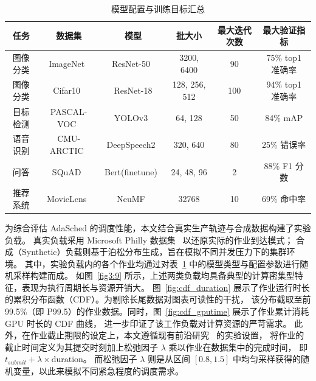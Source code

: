 \begin{table}[htbp]
  \centering
  \small %
  \setlength{\tabcolsep}{4pt} %
  \begin{threeparttable}
    \caption{模型配置与训练目标汇总}
    \label{tab:1}
    \begin{tabularx}{\textwidth}{c c c c c c}
      \toprule
      任务   & 数据集                                    & 模型                                   & 批大小           & 最大迭代次数 & 最大验证指标         \\
      \midrule
      图像分类 & ImageNet~\cite{deng2009imagenet}       & ResNet-50~\cite{he2016deep}          & 3200, 6400    & 90     & 75\% top1 准确率 \\
      图像分类 & Cifar10~\cite{krizhevsky2009learning}  & ResNet-18                            & 128, 256, 512 & 100    & 94\% top1 准确率  \\
      目标检测 & PASCAL-VOC~\cite{everingham2010pascal} & YOLOv3~\cite{redmon2018yolov3}       & 64, 128       & 50     & 84\% mAP       \\
      语音识别 & CMU-ARCTIC~\cite{kominek2004cmu}       & DeepSpeech2~\cite{amodei2016deep}    & 320, 640      & 80     & 25\% 错误率 \\
      问答   & SQuAD~\cite{rajpurkar2016squad}        & Bert(finetune)~\cite{devlin2019bert} & 24, 48, 96    & 2      & 88\% F1 分数  \\
      推荐系统 & MovieLens~\cite{harper2015movielens}   & NeuMF~\cite{he2017neural}            & 32768         & 10     & 69\% 命中率  \\
      \bottomrule
    \end{tabularx}
  \end{threeparttable}
\end{table}

为综合评估 AdaSched 的调度性能，本文结合真实生产轨迹与合成数据构建了实验负载。
真实负载采用 Microsoft Philly 数据集~\cite{jeon2019analysis} 以还原实际的作业到达模式；
合成（Synthetic）负载则基于泊松分布生成，旨在模拟不同并发压力下的集群环境。
其中，实验负载内的各个作业均通过对表~\ref{tab:1} 中的模型类型与配置参数进行随机采样构建而成。
如图~\ref{fig3:9} 所示，上述两类负载均具备典型的计算密集型特征，表现为执行周期长与资源开销大。
图~\ref{fig:cdf_duration} 展示了作业运行时长的累积分布函数（CDF）。为剔除长尾数据对图表可读性的干扰，
该分布截取至前 99.5\%（即 P99.5）的作业数据。同时，图~\ref{fig:cdf_gputime} 展示了作业累计消耗 GPU 时长的 CDF 曲线，
进一步印证了该工作负载对计算资源的严苛需求。
此外，在作业截止期限的设定上，本文遵循现有前沿研究~\cite{gao2021chronus,gu2023elasticflow} 的实验设置，
将作业的截止时间定义为其提交时刻加上松弛因子 $\lambda$ 乘以作业在数据集中的完成时间，
即 $t_{submit} + \lambda \times \text{duration}$。
而松弛因子 $\lambda$ 则是从区间 $\left[0.8, 1.5\right]$ 中均匀采样获得的随机变量，以此来模拟不同紧急程度的调度需求。

